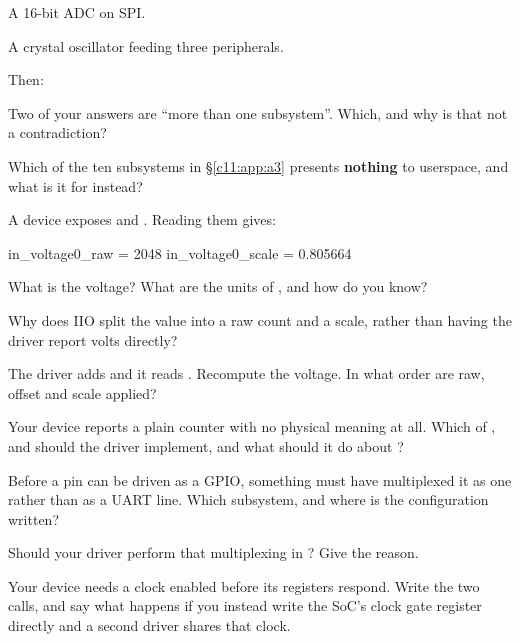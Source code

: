  A 16-bit ADC on SPI.

 A crystal oscillator feeding three peripherals.

Then:

 Two of your answers are ``more than one subsystem''. Which, and why is that not a
contradiction?

 Which of the ten subsystems in \S\ref{c11:app:a3} presents \textbf{nothing} to userspace,
and what is it for instead?

\label{c11:ex:3}

A device exposes  and . Reading them gives:

\begin{console}
in_voltage0_raw    = 2048
in_voltage0_scale  = 0.805664
\end{console}

 What is the voltage? What are the units of , and how do you know?

 Why does IIO split the value into a raw count and a scale, rather than having the driver
report volts directly?

 The driver adds  and it reads . Recompute the
voltage. In what order are raw, offset and scale applied?

 Your device reports a plain counter with no physical meaning at all. Which of ,
 and  should the driver implement, and what should it do about ?

\label{c11:ex:4}

 Before a pin can be driven as a GPIO, something must have multiplexed it as one rather
than as a UART line. Which subsystem, and where is the configuration written?

 Should your driver perform that multiplexing in ? Give the reason.

 Your device needs a clock enabled before its registers respond. Write the two calls, and
say what happens if you instead write the SoC's clock gate register directly and a second driver
shares that clock.

